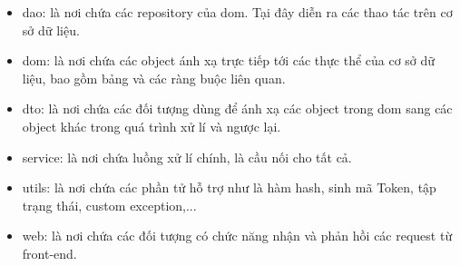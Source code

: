 \begin{itemize}
    \item dao: là nơi chứa các repository của dom. Tại đây diễn ra các thao tác trên cơ sở dữ liệu.
    \item dom: là nơi chứa các object ánh xạ trực tiếp tới các thực thể của cơ sở dữ liệu, bao gồm bảng và các ràng buộc liên quan.
    \item dto: là nơi chứa các đối tượng dùng để ánh xạ các object trong dom sang các object khác trong quá trình xử lí và ngược lại.
    \item service: là nơi chứa luồng xử lí chính, là cầu nối cho tất cả.
    \item utils: là nơi chứa các phần tử hỗ trợ như là hàm hash, sinh mã Token, tập trạng thái, custom exception,...
    \item web: là nơi chứa các đối tượng có chức năng nhận và phản hồi các request từ front-end.
\end{itemize}
